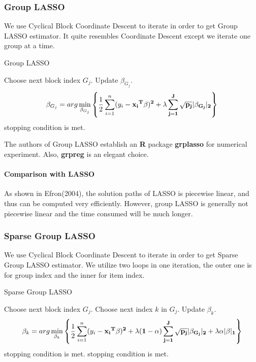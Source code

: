 \documentclass[]{article}
\begin{document}
\subsubsection{Group LASSO}
We use Cyclical Block Coordinate Descent\cite{wright2015coordinate} to iterate in order to get Group LASSO estimator. It quite resembles Coordinate Descent except we iterate one group at a time.
\begin{algorithm}  
	\caption{Group LASSO}  
	\begin{algorithmic}[1] %
		\Repeat
		\State Choose next block index $ G_j $.
		\State Update $ \beta_{G_j} $.
		\State \begin{equation*}
		\beta_{G_j} =arg\min \limits_{\beta_{G_j}} \left\{\frac{1}{2}\sum_{i=1}^n (y_i-\bf{x_i}^T\beta)^2+\lambda\sum_{j=1}^J \sqrt{p_j}|\beta_{G_j}|_2\right\} 
		\end{equation*}
		\Until stopping condition is met.
	\end{algorithmic}
\end{algorithm}

The authors of Group LASSO establish an \textbf{R} package \textbf{grplasso} for numerical experiment. Also, \textbf{grpreg} is an elegant choice.
\paragraph{Comparison with LASSO}
As shown in Efron(2004)\cite{efron2004least}, the solution paths of LASSO is piecewise linear, and thus can be computed very efficiently. However, group LASSO is generally not piecewise linear\cite{yuan2006model} and the time consumed will be much longer.


\subsubsection{Sparse Group LASSO}
We use Cyclical Block Coordinate Descent to iterate in order to get Sparse Group LASSO estimator. We utilize two loops in one iteration, the outer one is for group index and the inner for item index.
\begin{algorithm}  
	\caption{Sparse Group LASSO}  
	\begin{algorithmic}[1] %
		\Repeat
		\State Choose next block index $ G_j $.
		\Repeat
		\State Choose next index $k$ in $G_j$. 
		\State Update $ \beta_{k} $.
		\State \begin{equation*}
		\beta_{k} =arg\min \limits_{\beta_{k}} \left\{\frac{1}{2}\sum_{i=1}^n (y_i-\bf{x_i}^T\beta)^2+\lambda (1-\alpha)\sum_{j=1}^J \sqrt{p_j}|\beta_{G_j}|_2+\lambda\alpha|\beta|_1\right\} 
		\end{equation*}
		\Until stopping condition is met.
		\Until stopping condition is met.
	\end{algorithmic}
\end{algorithm}
\end{document}
